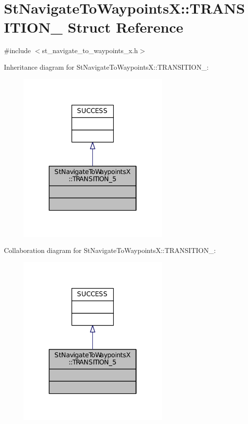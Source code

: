\hypertarget{structStNavigateToWaypointsX_1_1TRANSITION__5}{}\section{St\+Navigate\+To\+WaypointsX\+:\+:T\+R\+A\+N\+S\+I\+T\+I\+O\+N\+\_ Struct Reference}
\label{structStNavigateToWaypointsX_1_1TRANSITION__5}


{\ttfamily \#include $<$st\+\_\+navigate\+\_\+to\+\_\+waypoints\+\_\+x.\+h$>$}



Inheritance diagram for St\+Navigate\+To\+WaypointsX\+:\+:T\+R\+A\+N\+S\+I\+T\+I\+O\+N\+\_\+:
\nopagebreak
\begin{figure}[H]
\begin{center}
\leavevmode
\includegraphics[width=214pt]{structStNavigateToWaypointsX_1_1TRANSITION__5__inherit__graph}
\end{center}
\end{figure}


Collaboration diagram for St\+Navigate\+To\+WaypointsX\+:\+:T\+R\+A\+N\+S\+I\+T\+I\+O\+N\+\_\+:
\nopagebreak
\begin{figure}[H]
\begin{center}
\leavevmode
\includegraphics[width=214pt]{structStNavigateToWaypointsX_1_1TRANSITION__5__coll__graph}
\end{center}
\end{figure}


